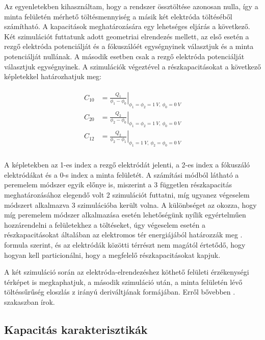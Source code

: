 Az egyenletekben kihasználtam, hogy a rendszer össztöltése azonosan nulla, így a minta felületén mérhető töltésmennyiség a másik két elektróda töltéséből számítható. A kapacitások meghatározására egy lehetséges eljárás a következő. Két szimulációt futtatunk adott geometriai elrendezés mellett, az első esetén a rezgő elektróda potenciálját és a fókuszálóét egységnyinek választjuk és a minta potenciálját nullának. A második esetben csak a rezgő elektróda potenciálját választjuk egységnyinek. A szimulációk végeztével a részkapacitásokat a következő képletekkel határozhatjuk meg:

\begin{align}
    \begin{split}
        C_{10} &= \left.\frac{Q_1}{\phi_1-\phi_0}\right\rvert_{\phi_1 = \phi_2 = 1\ V,\ \phi_0 = 0\ V}\\
        C_{20} &= \left.\frac{Q_2}{\phi_2-\phi_0}\right\rvert_{\phi_1 = \phi_2 = 1\ V,\ \phi_0 = 0\ V}\\
        C_{12} &= \left.\frac{Q_2}{\phi_2-\phi_1}\right\rvert_{\phi_1 = 1\ V,\ \phi_2 = \phi_0 = 0\ V}\\
    \end{split}
\end{align}

A képletekben az 1-es index a rezgő elektródát jelenti, a 2-es index a fókuszáló elektródákat és a 0-s index a minta felületét. A számítási módból látható a peremelem módszer egyik előnye is, miszerint a 3 független részkapacitás meghatározásához elegendő volt 2 szimulációt futtatni, míg ugyanez végeselem módszert alkalmazva 3 szimulációba került volna. A különbséget az okozza, hogy míg peremelem módszer alkalmazása esetén lehetőségünk nyílik egyértelműen hozzárendelni a felületekhez a töltéseket, úgy végeselem esetén a részkapacitásokat általában az elektromos tér energiájából határozzák meg . formula szerint, és az elektródák közötti térrészt nem magától értetődő, hogy hogyan kell particionálni, hogy a megfelelő részkapacitásokat kapjuk.


A két szimuláció során az elektróda-elrendezéshez köthető felületi érzékenységi térképet is megkaphatjuk, a második szimuláció után, a minta felületén lévő töltéssűrűség eloszlás z irányú deriváltjának formájában. Erről bővebben . szakaszban írok.

\subsection{Kapacitás karakterisztikák}

